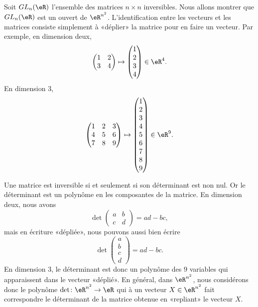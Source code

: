 \begin{example} \label{ExBNOQEWe}
	Soit  \( GL_n(\eR)\) l'ensemble des matrices \( n \times n\) inversibles.   Nous allons montrer que \( GL_n(\eR)\) est un ouvert de \(  \eR^{n^2}\). L'identification entre les vecteurs et les matrices consiste simplement à «déplier» la matrice pour en faire un vecteur. Par exemple, en dimension deux,
	\begin{equation}
		\begin{pmatrix}
			1 & 2 \\
			3 & 4
		\end{pmatrix}\mapsto
		\begin{pmatrix}
			1 \\
			2 \\
			3 \\
			4
		\end{pmatrix}\in\eR^4.
	\end{equation}
	En dimension \( 3\),
	\begin{equation}
		\begin{aligned}[]
			\begin{pmatrix}
				1 & 2 & 3 \\
				4 & 5 & 6 \\
				7 & 8 & 9
			\end{pmatrix}
			\mapsto
			\begin{pmatrix}
				1 \\
				2 \\
				3 \\
				4 \\
				5 \\
				6 \\
				7 \\
				8 \\
				9
			\end{pmatrix}\in\eR^9.
		\end{aligned}
	\end{equation}

	Une matrice est inversible si et seulement si son déterminant est non nul. Or le déterminant est un polynôme en les composantes de la matrice. En dimension deux, nous avons
	\begin{equation}
		\det\begin{pmatrix}
			a & b \\
			c & d
		\end{pmatrix}=ad-bc,
	\end{equation}
	mais en écriture «dépliée», nous pouvons aussi bien écrire
	\begin{equation}
		\det\begin{pmatrix}
			a \\
			b \\
			c \\
			d
		\end{pmatrix}=ad-bc.
	\end{equation}
	En dimension \( 3\), le déterminant est donc un polynôme des \( 9\) variables qui apparaissent dans le vecteur «déplié». En général, dans \( \eR^{n^2}\), nous considérons donc le polynôme \( \det\colon \eR^{n^2}\to \eR\) qui à un vecteur \( X\in\eR^{n^2}\) fait correspondre le déterminant de la matrice obtenue en «repliant» le vecteur \( X\).


\end{example}
